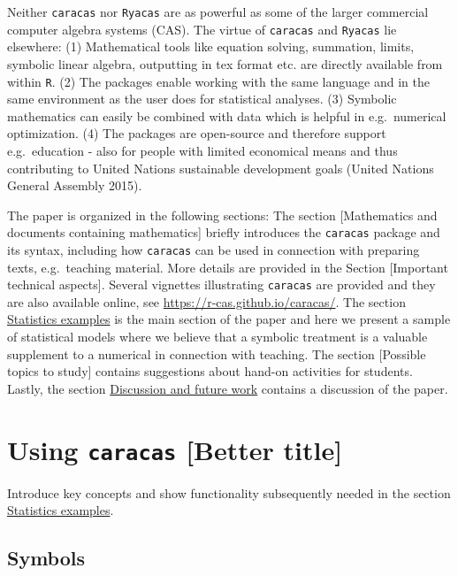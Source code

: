 Neither \texttt{caracas} nor \texttt{Ryacas} are as powerful as some
of the larger commercial computer algebra systems (CAS). The virtue of
\texttt{caracas} and \texttt{Ryacas} lie elsewhere:
(1) Mathematical tools like equation solving, summation, limits, symbolic linear
algebra, outputting in tex format etc. are directly available from
within \texttt{R}.
(2) The packages enable working with the same language and in the same
environment as the user does for statistical analyses.
(3) Symbolic mathematics can easily be combined with data which is
helpful in e.g.~numerical optimization.
(4) The packages are open-source and therefore support e.g.~education - also for people
with limited economical means and thus contributing to United
Nations sustainable development goals (United Nations General Assembly 2015).

The paper is organized in the following sections: The section
{[}Mathematics and documents containing mathematics{]} briefly introduces
the \texttt{caracas} package and its syntax, including how \texttt{caracas} can be
used in connection with preparing texts, e.g.~teaching material. More
details are provided in the Section {[}Important technical aspects{]}.
Several vignettes illustrating \texttt{caracas} are provided and they are
also available online, see \url{https://r-cas.github.io/caracas/}. The
section \protect\hyperlink{statistics-examples}{Statistics examples} is the main section of the paper and
here we present a sample of statistical models where we believe that a
symbolic treatment is a valuable supplement to a numerical in
connection with teaching. The section {[}Possible topics to study{]}
contains suggestions about hand-on activities for students. Lastly,
the section \protect\hyperlink{discussion-and-future-work}{Discussion and future work} contains a discussion of the
paper.

\hypertarget{using-caracas-better-title}{%
\section{\texorpdfstring{Using \texttt{caracas} {[}Better title{]}}{Using caracas {[}Better title{]}}}\label{using-caracas-better-title}}

Introduce key concepts and show functionality subsequently needed in the section \protect\hyperlink{statistics-examples}{Statistics examples}.

\hypertarget{symbols}{%
\subsection{Symbols}\label{symbols}}

